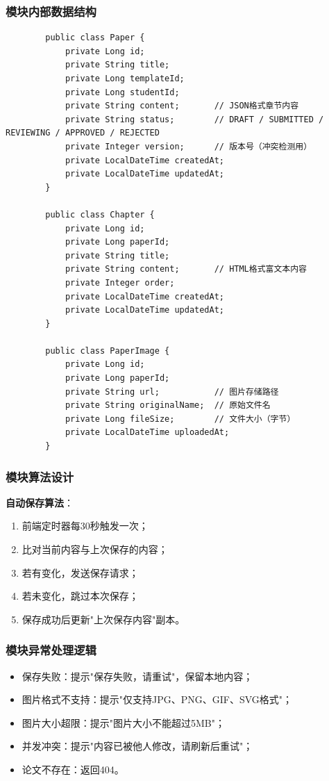\documentclass{../template/softeng}
\begin{document}
	\subsubsection{模块内部数据结构}
	\begin{verbatim}
		public class Paper {
			private Long id;
			private String title;
			private Long templateId;
			private Long studentId;
			private String content;       // JSON格式章节内容
			private String status;        // DRAFT / SUBMITTED / REVIEWING / APPROVED / REJECTED
			private Integer version;      // 版本号（冲突检测用）
			private LocalDateTime createdAt;
			private LocalDateTime updatedAt;
		}

		public class Chapter {
			private Long id;
			private Long paperId;
			private String title;
			private String content;       // HTML格式富文本内容
			private Integer order;
			private LocalDateTime createdAt;
			private LocalDateTime updatedAt;
		}

		public class PaperImage {
			private Long id;
			private Long paperId;
			private String url;           // 图片存储路径
			private String originalName;  // 原始文件名
			private Long fileSize;        // 文件大小（字节）
			private LocalDateTime uploadedAt;
		}
	\end{verbatim}

	\subsubsection{模块算法设计}
	\textbf{自动保存算法}：
	\begin{enumerate}
		\item 前端定时器每30秒触发一次；
		\item 比对当前内容与上次保存的内容；
		\item 若有变化，发送保存请求；
		\item 若未变化，跳过本次保存；
		\item 保存成功后更新"上次保存内容"副本。
	\end{enumerate}

	\subsubsection{模块异常处理逻辑}
	\begin{itemize}
		\item 保存失败：提示"保存失败，请重试"，保留本地内容；
		\item 图片格式不支持：提示"仅支持JPG、PNG、GIF、SVG格式"；
		\item 图片大小超限：提示"图片大小不能超过5MB"；
		\item 并发冲突：提示"内容已被他人修改，请刷新后重试"；
		\item 论文不存在：返回404。
	\end{itemize}
\end{document}
